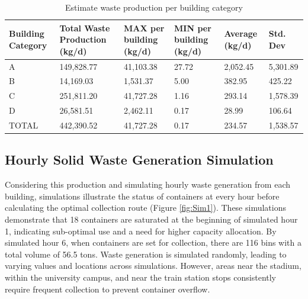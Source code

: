 \documentclass[authoryear,preprint,review,doubleblind, 12pt]{elsarticle}
\begin{document}
    \begin{table}[!h]
        \centering
        \caption{Estimate waste production per building category}
        \scriptsize
        \label{tab:Waste2}
        \begin{tabularx}{\linewidth}{l LLLLL}
            \toprule
            Building Category&Total Waste Production (kg/d)&MAX per building (kg/d)&MIN per building (kg/d)&Average (kg/d)& Std. Dev\\ 
            \midrule
            A&149,828.77&41,103.38&27.72&2,052.45&5,301.89\\
            B&14,169.03&1,531.37&5.00&382.95&425.22\\
            C&251,811.20&41,727.28&1.16&293.14&1,578.39\\
            D&26,581.51&2,462.11&0.17&28.99&106.64\\
            \midrule
            TOTAL&442,390.52&41,727.28&0.17&234.57&1,538.57\\
            \bottomrule
        \end{tabularx}
    \end{table}

    \subsection{Hourly Solid Waste Generation Simulation} \label{subsec:Simulation}

    Considering this production and simulating hourly waste generation from each building, simulations illustrate the status of containers at every hour before calculating the optimal collection route (Figure \ref{fig:Sim1}). These simulations demonstrate that 18 containers are saturated at the beginning of simulated hour 1, indicating sub-optimal use and a need for higher capacity allocation. By simulated hour 6, when containers are set for collection, there are 116 bins with a total volume of 56.5 tons. Waste generation is simulated randomly, leading to varying values and locations across simulations. However, areas near the stadium, within the university campus, and near the train station stops consistently require frequent collection to prevent container overflow.
\end{document}
